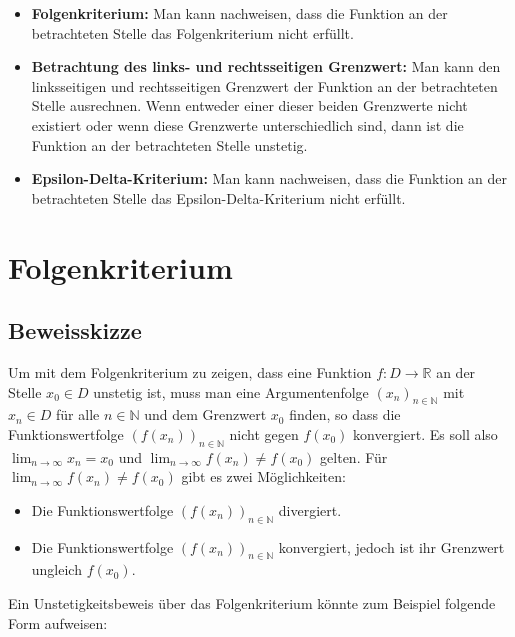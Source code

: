 \documentclass[fontsize=9pt,
               parskip=half-,
               DIV=14,
               listof=chapterentry,
               tocflat]{scrbook}
\begin{document}
\begin{itemize}
\item \textbf{Folgenkriterium:} Man kann nachweisen, dass die Funktion an der betrachteten Stelle das Folgenkriterium nicht erfüllt.
\item \textbf{Betrachtung des links- und rechtsseitigen Grenzwert:} Man kann den linksseitigen und rechtsseitigen Grenzwert der Funktion an der betrachteten Stelle ausrechnen. Wenn entweder einer dieser beiden Grenzwerte nicht existiert oder wenn diese Grenzwerte unterschiedlich sind, dann ist die Funktion an der betrachteten Stelle unstetig.
\item \textbf{Epsilon-Delta-Kriterium:} Man kann nachweisen, dass die Funktion an der betrachteten Stelle das Epsilon-Delta-Kriterium nicht erfüllt.
\end{itemize}

\section{Folgenkriterium}

\subsection{Beweisskizze}

Um mit dem Folgenkriterium zu zeigen, dass eine Funktion $f:D\to \mathbb {R} $ an der Stelle $x_{0}\in D$ unstetig ist, muss man eine Argumentenfolge $(x_{n})_{n\in \mathbb {N} }$ mit $x_{n}\in D$ für alle $n\in \mathbb {N} $ und dem Grenzwert $x_{0}$ finden, so dass die Funktionswertfolge $\left(f(x_{n})\right)_{n\in \mathbb {N} }$ nicht gegen $f(x_{0})$ konvergiert. Es soll also $\lim _{n\to \infty }x_{n}=x_{0}$ und $\lim _{n\to \infty }f(x_{n})\neq f(x_{0})$ gelten. Für $\lim _{n\to \infty }f(x_{n})\neq f(x_{0})$ gibt es zwei Möglichkeiten:

\begin{itemize}
\item Die Funktionswertfolge $\left(f(x_{n})\right)_{n\in \mathbb {N} }$ divergiert.
\item Die Funktionswertfolge $\left(f(x_{n})\right)_{n\in \mathbb {N} }$ konvergiert, jedoch ist ihr Grenzwert ungleich $f(x_{0})$.
\end{itemize}

Ein Unstetigkeitsbeweis über das Folgenkriterium könnte zum Beispiel folgende Form aufweisen:
\end{document}
